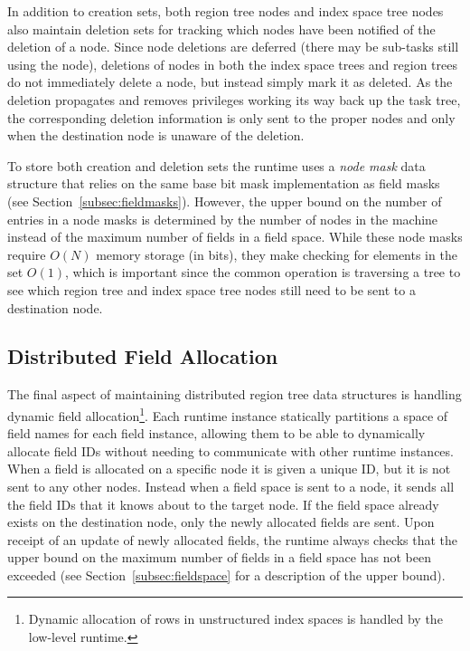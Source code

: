 In addition to creation sets, both region
tree nodes and index space tree nodes also
maintain deletion sets for tracking which nodes 
have been notified of the deletion of a node. 
Since node deletions are deferred
(there may be sub-tasks still using the node),
deletions of nodes in both the index space trees
and region trees do not immediately delete a
node, but instead simply mark it as deleted.
As the deletion propagates and removes privileges
working its way back up the task tree, the 
corresponding deletion information is only sent
to the proper nodes and only when the destination
node is unaware of the deletion.

To store both creation and deletion sets the
runtime uses a {\em node mask} data structure
that relies on the same base bit mask 
implementation as field masks (see
Section~\ref{subsec:fieldmasks}). However,
the upper bound on the number of entries in a
node masks is determined by the number of nodes
in the machine instead of the maximum number of
fields in a field space. While these node masks 
require $O(N)$ memory storage (in bits), 
they make checking for elements in the set $O(1)$, 
which is important since the common operation is 
traversing a tree to see which region tree and 
index space tree nodes still need to be sent to 
a destination node.

\subsection{Distributed Field Allocation}
\label{subsec:distfields}
The final aspect of maintaining distributed
region tree data structures is handling dynamic
field allocation\footnote{Dynamic allocation of
rows in unstructured index spaces is handled
by the low-level runtime.}. Each runtime instance 
statically partitions a space of field names for 
each field instance, allowing them to be able to
dynamically allocate field IDs without needing
to communicate with other runtime instances.
When a field is allocated on a specific node
it is given a unique ID, but it is not sent
to any other nodes.  Instead when a field space
is sent to a node, it sends all the field IDs
that it knows about to the target node. If the
field space already exists on the destination
node, only the newly allocated fields are sent.
Upon receipt of an update of newly allocated 
fields, the runtime always checks that the 
upper bound on the maximum number of fields
in a field space has not been exceeded (see
Section~\ref{subsec:fieldspace} for a description
of the upper bound).

